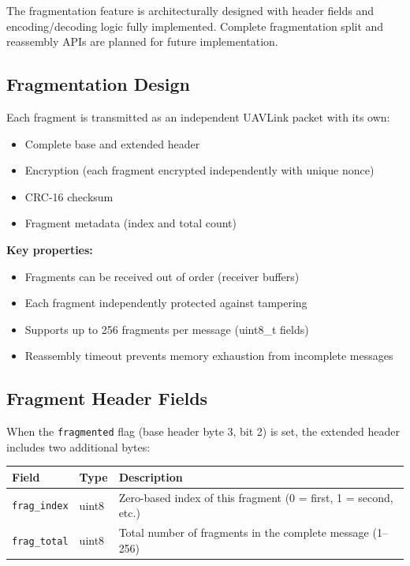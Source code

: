 \documentclass[11pt,a4paper]{article}
\begin{document}
\begin{notebox}
The fragmentation feature is architecturally designed with header fields and encoding/decoding logic fully implemented. Complete fragmentation split and reassembly APIs are planned for future implementation.
\end{notebox}

\subsection{Fragmentation Design}

Each fragment is transmitted as an independent UAVLink packet with its own:
\begin{itemize}[noitemsep]
    \item Complete base and extended header
    \item Encryption (each fragment encrypted independently with unique nonce)
    \item CRC-16 checksum
    \item Fragment metadata (index and total count)
\end{itemize}

\textbf{Key properties:}
\begin{itemize}[noitemsep]
    \item Fragments can be received out of order (receiver buffers)
    \item Each fragment independently protected against tampering
    \item Supports up to 256 fragments per message (uint8\_t fields)
    \item Reassembly timeout prevents memory exhaustion from incomplete messages
\end{itemize}

\subsection{Fragment Header Fields}

When the \texttt{fragmented} flag (base header byte 3, bit 2) is set, the extended header includes two additional bytes:

\begin{table}[H]
\centering
\begin{tabular}{@{}llp{8cm}@{}}
\toprule
\textbf{Field} & \textbf{Type} & \textbf{Description} \\
\midrule
\texttt{frag\_index} & uint8 & Zero-based index of this fragment (0 = first, 1 = second, etc.) \\
\texttt{frag\_total} & uint8 & Total number of fragments in the complete message (1--256) \\
\bottomrule
\end{tabular}
\end{table}
\end{document}
